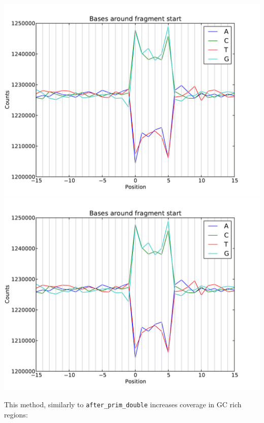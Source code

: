 \begin{center}
\includegraphics[scale=0.6,page=1]{../src/test/pos_bias/pb_after_prim.pdf}
\\
\includegraphics[scale=0.6,page=2]{../src/test/pos_bias/pb_after_prim.pdf}
\end{center}

This method, similarly to \texttt{after\_prim\_double} increases coverage in GC rich regions:

